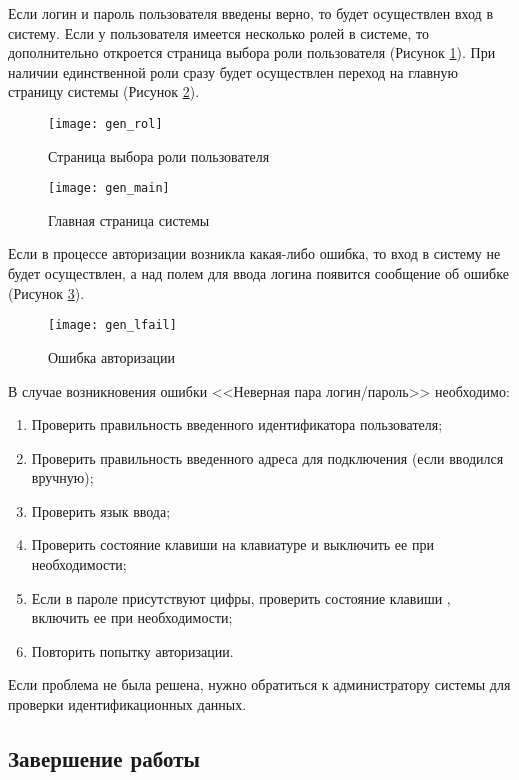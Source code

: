 Если логин и пароль пользователя введены верно, то будет осуществлен вход в систему. Если у пользователя имеется несколько ролей в системе, то дополнительно откроется страница выбора роли пользователя (Рисунок \ref{img_gen_rol}). При наличии единственной роли сразу будет осуществлен переход на главную страницу системы (Рисунок \ref{img_gen_main}).

\begin{figure}[!ht]\centering
 \texttt{[image: gen\_rol]}
 \caption{Страница выбора роли пользователя}
 \label{img_gen_rol}
\end{figure} 

\begin{figure}[!ht]\centering
 \texttt{[image: gen\_main]}
 \caption{Главная страница системы}
 \label{img_gen_main}
\end{figure} 

Если в процессе авторизации возникла какая-либо ошибка, то вход в систему не будет осуществлен, а над полем для ввода логина появится сообщение об ошибке (Рисунок \ref{img_gen_lfail}).

\begin{figure}[!ht]\centering
 \texttt{[image: gen\_lfail]}
 \caption{Ошибка авторизации}
 \label{img_gen_lfail}
\end{figure} 

В случае возникновения ошибки <<Неверная пара логин/пароль>> необходимо:
\begin{enumerate}
 \item Проверить правильность введенного идентификатора пользователя;
 \item Проверить правильность введенного адреса для подключения (если вводился вручную);
 \item Проверить язык ввода;
 \item Проверить состояние клавиши  на клавиатуре и выключить ее при необходимости;
 \item Если в пароле присутствуют цифры, проверить состояние клавиши , включить ее при необходимости;
 \item Повторить попытку авторизации.
\end{enumerate}
 
Если проблема не была решена, нужно обратиться к администратору системы для проверки идентификационных данных.



\subsection{Завершение работы}

